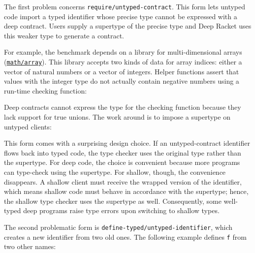 \documentclass[ twoside,open=right,titlepage,numbers=noenddot,headinclude,%
                footinclude=true,cleardoublepage=empty,abstract=off,
                BCOR=5mm,paper=a4,fontsize=11pt,%
                ngerman,american,%
                parts,pdfspacing]{scrreprt}
\newcommand{\Scribtexttt}[1]{{\texttt{#1}}}
\begin{document}
The first problem concerns \Scribtexttt{require/untyped{-}contract}.
This form lets untyped code import a typed identifier whose precise type
 cannot be expressed with a deep contract.
Users supply a supertype of the precise type and Deep Racket uses this
 weaker type to generate a contract.

For example, the  benchmark depends on a library for multi{-}dimensional
 arrays (\href{https://docs.racket-lang.org/math/array.html}{\Scribtexttt{math/array}}).
This library accepts two kinds of data for array indices:
 either a vector of natural numbers or a vector of integers.
Helper functions assert that values with the integer type do not actually
 contain negative numbers using a run{-}time checking function:

\relax{\smallskip}

\noindent{}Deep contracts cannot express the type for the checking
 function because they lack support for true unions.
The work around is to impose a supertype on untyped clients:

\relax{\smallskip}

This form comes with a surprising design choice.
If an untyped{-}contract identifier flows back into typed code,
 the type checker uses the original type rather than the supertype.
For deep code, the choice is convenient because more programs can type{-}check
 using the supertype.
For shallow, though, the convenience disappears.
A shallow client must receive the wrapped version of the identifier,
 which means shallow code must behave in accordance with the supertype;
 hence, the shallow type checker uses the supertype as well.
Consequently, some well{-}typed deep programs raise type errors upon switching
 to shallow types.

The second problematic form is \Scribtexttt{define{-}typed/untyped{-}identifier},
 which creates a new identifier from two old ones.
The following example defines \Scribtexttt{f} from two other names:

\relax{\smallskip}
\end{document}
